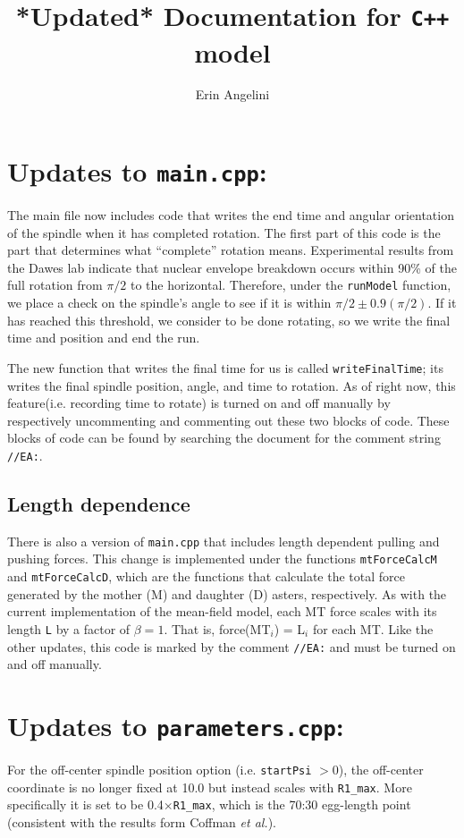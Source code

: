\documentclass{article}
\author{Erin Angelini}
\title{*Updated* Documentation for \texttt{C++} model}
\begin{document}
\maketitle
\section{Updates to \texttt{main.cpp}:}
The main file now includes code that writes the end time and angular orientation of the spindle when it has completed rotation. The first part of this code is the part that determines what ``complete'' rotation means. Experimental results from the Dawes lab indicate that nuclear envelope breakdown occurs within 90\% of the full rotation from $\pi/2$ to the horizontal. Therefore, under the \texttt{runModel} function, we place a check on the spindle's angle to see if it is within $\pi/2 \pm 0.9(\pi/2)$. If it has reached this threshold, we consider to be done rotating, so we write the final time and position and end the run.

The new function that writes the final time for us is called \texttt{writeFinalTime}; its writes the final spindle position, angle, and time to rotation. As of right now, this feature(i.e. recording time to rotate) is turned on and off manually by respectively uncommenting and commenting out these two blocks of code. These blocks of code can be found by searching the document for the comment string \texttt{//EA:}.

\subsection{Length dependence}
There is also a version of \texttt{main.cpp} that includes length dependent pulling and pushing forces. This change is implemented under the functions \texttt{mtForceCalcM} and \texttt{mtForceCalcD}, which are the functions that calculate the total force generated by the mother (M) and daughter (D) asters, respectively. As with the current implementation of the mean-field model, each MT force scales with its length \texttt{L} by a factor of $\beta = 1$. That is, force(MT$_i$) = L$_i$ for each MT. Like the other updates, this code is marked by the comment \texttt{//EA:} and must be turned on and off manually.

\section{Updates to \texttt{parameters.cpp}:}
For the off-center spindle position option (i.e. \texttt{startPsi} $> 0$), the off-center coordinate is no longer fixed at 10.0 but instead scales with \texttt{R1\_max}. More specifically it is set to be 0.4$\times$\texttt{R1\_max}, which is the 70:30 egg-length point (consistent with the results form Coffman \emph{et al.}).
\end{document}
